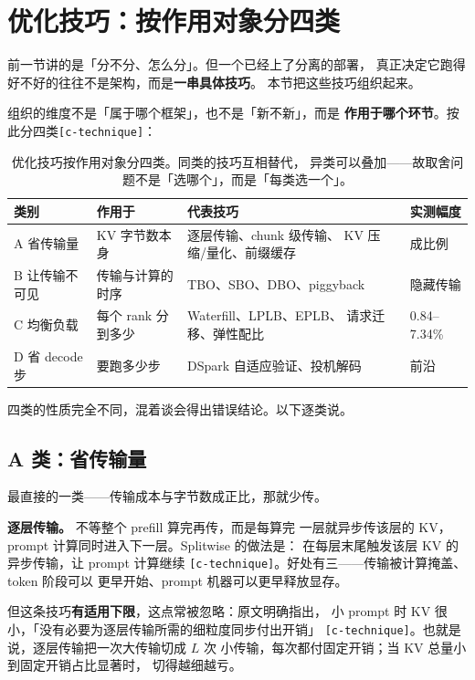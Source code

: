 \section{优化技巧：按作用对象分四类}
\label{sec:technique}

前一节讲的是「分不分、怎么分」。但一个已经上了分离的部署，
真正决定它跑得好不好的往往不是架构，而是\textbf{一串具体技巧}。
本节把这些技巧组织起来。

组织的维度不是「属于哪个框架」，也不是「新不新」，而是
\textbf{作用于哪个环节}。按此分四类\texttt{[c-technique]}：

\begin{table}[t]
\centering
\caption{优化技巧按作用对象分四类。同类的技巧互相替代，
异类可以叠加——故取舍问题不是「选哪个」，而是「每类选一个」。}
\label{tab:technique}
\small
\setlength{\tabcolsep}{5pt}
\begin{tabular}{@{}p{1.12cm}p{1.19cm}p{1.89cm}p{2.8cm}@{}}
\toprule
类别 & 作用于 & 代表技巧 & 实测幅度 \\
\midrule
A 省传输量 & KV 字节数本身 & 逐层传输、chunk 级传输、
  KV 压缩/量化、前缀缓存 & 成比例 \\
B 让传输不可见 & 传输与计算的时序 & TBO、SBO、DBO、piggyback
  & 隐藏传输 \\
C 均衡负载 & 每个 rank 分到多少 & Waterfill、LPLB、EPLB、
  请求迁移、弹性配比 & 0.84--7.34\% \\
D 省 decode 步 & 要跑多少步 & DSpark 自适应验证、投机解码
  & 前沿 \\
\bottomrule
\end{tabular}
\end{table}

四类的性质完全不同，混着谈会得出错误结论。以下逐类说。

\subsection{A 类：省传输量}

最直接的一类——传输成本与字节数成正比，那就少传。

\noindent\textbf{逐层传输。} 不等整个 prefill 算完再传，而是每算完
一层就异步传该层的 KV，prompt 计算同时进入下一层。Splitwise 的做法是：
在每层末尾触发该层 KV 的异步传输，让 prompt 计算继续
\texttt{[c-technique]}。好处有三——传输被计算掩盖、token 阶段可以
更早开始、prompt 机器可以更早释放显存。

\noindent 但这条技巧\textbf{有适用下限}，这点常被忽略：原文明确指出，
小 prompt 时 KV 很小，「没有必要为逐层传输所需的细粒度同步付出开销」
\texttt{[c-technique]}。也就是说，逐层传输把一次大传输切成 $L$ 次
小传输，每次都付固定开销；当 KV 总量小到固定开销占比显著时，
切得越细越亏。

